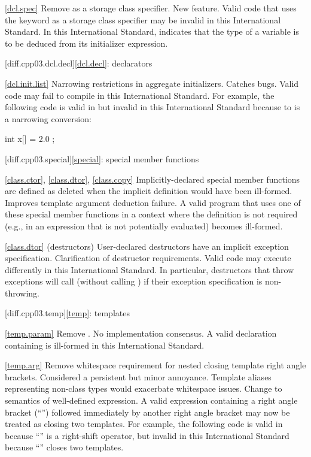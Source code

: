 \ref{dcl.spec}
\change Remove  as a storage class specifier.
\rationale New feature.
\effect
Valid \CppIII code that uses the keyword  as a storage class
specifier may be invalid in this International Standard. In this International
Standard,  indicates that the type of a variable is to be deduced
from its initializer expression.

[diff.cpp03.dcl.decl]{\ref{dcl.decl}: declarators}

\ref{dcl.init.list}
\change Narrowing restrictions in aggregate initializers.
\rationale Catches bugs.
\effect
Valid \CppIII code may fail to compile in this International Standard. For
example, the following code is valid in \CppIII but invalid in this
International Standard because  to  is a narrowing
conversion:

\begin{codeblock}
int x[] = { 2.0 };
\end{codeblock}

[diff.cpp03.special]{\ref{special}: special member functions}

\ref{class.ctor}, \ref{class.dtor}, \ref{class.copy}
\change Implicitly-declared special member functions are defined as deleted
when the implicit definition would have been ill-formed.
\rationale Improves template argument deduction failure.
\effect
A valid \CppIII program that uses one of these special member functions in a
context where the definition is not required (e.g., in an expression that is
not potentially evaluated) becomes ill-formed.

\ref{class.dtor} (destructors)
\change User-declared destructors have an implicit exception specification.
\rationale Clarification of destructor requirements.
\effect
Valid \CppIII code may execute differently in this International Standard. In
particular, destructors that throw exceptions will call 
(without calling ) if their exception specification is
non-throwing.

[diff.cpp03.temp]{\ref{temp}: templates}

\ref{temp.param}
\change Remove .
\rationale No implementation consensus.
\effect
A valid \CppIII declaration containing  is ill-formed in this
International Standard.

\ref{temp.arg}
\change Remove whitespace requirement for nested closing template right angle
brackets.
\rationale Considered a persistent but minor annoyance. Template aliases
representing non-class types would exacerbate whitespace issues.
\effect
Change to semantics of well-defined expression. A valid \CppIII expression
containing a right angle bracket (``\tcode{>}'') followed immediately by
another right angle bracket may now be treated as closing two templates.
For example, the following code is valid in \CppIII because ``\tcode{>>}''
is a right-shift operator, but invalid in this International Standard because
``\tcode{>>}'' closes two templates.

